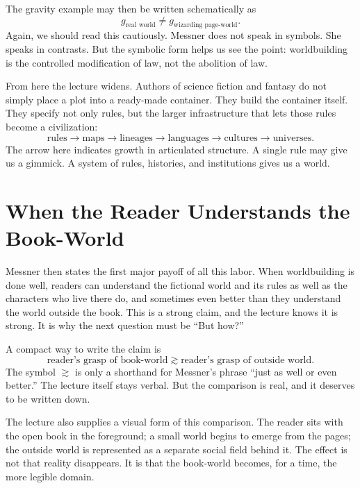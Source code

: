 The gravity example may then be written schematically as
\begin{equation}
g_{\text{real world}} \neq g_{\text{wizarding page-world}}.
\end{equation}
Again, we should read this cautiously. Messner does not speak in symbols. She speaks in contrasts. But the symbolic form helps us see the point: worldbuilding is the controlled modification of law, not the abolition of law.

From here the lecture widens. Authors of science fiction and fantasy do not simply place a plot into a ready-made container. They build the container itself. They specify not only rules, but the larger infrastructure that lets those rules become a civilization:
\begin{equation}
\text{rules} \to \text{maps} \to \text{lineages} \to \text{languages} \to \text{cultures} \to \text{universes}.
\end{equation}
The arrow here indicates growth in articulated structure. A single rule may give us a gimmick. A system of rules, histories, and institutions gives us a world.

\section{When the Reader Understands the Book-World}

Messner then states the first major payoff of all this labor. When worldbuilding is done well, readers can understand the fictional world and its rules as well as the characters who live there do, and sometimes even better than they understand the world outside the book. This is a strong claim, and the lecture knows it is strong. It is why the next question must be ``But how?''

A compact way to write the claim is
\begin{equation}
\text{reader's grasp of book-world} \gtrsim \text{reader's grasp of outside world}.
\end{equation}
The symbol \(\gtrsim\) is only a shorthand for Messner's phrase ``just as well or even better.'' The lecture itself stays verbal. But the comparison is real, and it deserves to be written down.

The lecture also supplies a visual form of this comparison. The reader sits with the open book in the foreground; a small world begins to emerge from the pages; the outside world is represented as a separate social field behind it. The effect is not that reality disappears. It is that the book-world becomes, for a time, the more legible domain.

